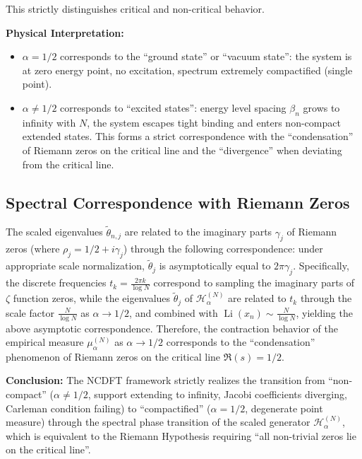 \documentclass[12pt,a4paper]{amsart}
\theoremstyle{plain}
\theoremstyle{definition}
\theoremstyle{remark}
\begin{document}
This strictly distinguishes critical and non-critical behavior.

\textbf{Physical Interpretation:}
\begin{itemize}
    \item $\alpha=1/2$ corresponds to the ``ground state'' or ``vacuum state'': the system is at zero energy point, no excitation, spectrum extremely compactified (single point).
    \item $\alpha \neq 1/2$ corresponds to ``excited states'': energy level spacing $\beta_n$ grows to infinity with $N$, the system escapes tight binding and enters non-compact extended states. This forms a strict correspondence with the ``condensation'' of Riemann zeros on the critical line and the ``divergence'' when deviating from the critical line.
\end{itemize}

\subsection{Spectral Correspondence with Riemann Zeros}

The scaled eigenvalues $\tilde{\theta}_{n,j}$ are related to the imaginary parts $\gamma_j$ of Riemann zeros (where $\rho_j = 1/2 + i\gamma_j$) through the following correspondence: under appropriate scale normalization, $\tilde{\theta}_j$ is asymptotically equal to $2\pi\gamma_j$. Specifically, the discrete frequencies $t_k = \frac{2\pi k}{\log N}$ correspond to sampling the imaginary parts of $\zeta$ function zeros, while the eigenvalues $\tilde{\theta}_j$ of $\mathcal{H}_\alpha^{(N)}$ are related to $t_k$ through the scale factor $\frac{N}{\log N}$ as $\alpha \to 1/2$, and combined with $\operatorname{Li}(x_n) \sim \frac{N}{\log N}$, yielding the above asymptotic correspondence. Therefore, the contraction behavior of the empirical measure $\mu_\alpha^{(N)}$ as $\alpha \to 1/2$ corresponds to the ``condensation'' phenomenon of Riemann zeros on the critical line $\Re(s)=1/2$.

\textbf{Conclusion:} The NCDFT framework strictly realizes the transition from ``non-compact'' ($\alpha \neq 1/2$, support extending to infinity, Jacobi coefficients diverging, Carleman condition failing) to ``compactified'' ($\alpha = 1/2$, degenerate point measure) through the spectral phase transition of the scaled generator $\mathcal{H}_\alpha^{(N)}$, which is equivalent to the Riemann Hypothesis requiring ``all non-trivial zeros lie on the critical line''.
\end{document}
